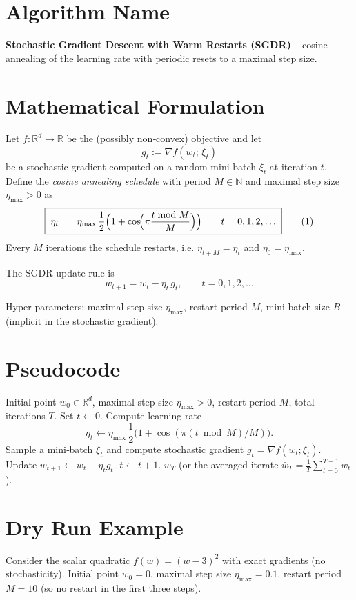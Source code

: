 \documentclass{article}
\newcommand{\R}{\mathbb{R}}
\begin{document}
\section*{Algorithm Name}
\textbf{Stochastic Gradient Descent with Warm Restarts (SGDR)} – cosine annealing of the learning rate with periodic resets to a maximal step size.

\section*{Mathematical Formulation}
Let $f:\R^{d}\to\R$ be the (possibly non‑convex) objective and let 
\[
g_t:=\nabla f(w_t;\,\xi_t)
\]
be a stochastic gradient computed on a random mini‑batch $\xi_t$ at iteration $t$.  
Define the \emph{cosine annealing schedule} with period $M\in\mathbb{N}$ and maximal step size $\eta_{\max}>0$ as
\[
\boxed{\;
\eta_t \;=\; \eta_{\max}\,\frac{1}{2}\Bigl(1+\cos\!\Bigl(\pi\frac{t\bmod M}{M}\Bigr)\Bigr)
\qquad t=0,1,2,\dots
\;}
\tag{1}
\]
Every $M$ iterations the schedule restarts, i.e. $\eta_{t+M}=\eta_t$ and $\eta_{0}=\eta_{\max}$.

The SGDR update rule is
\[
\boxed{\;
w_{t+1}=w_t-\eta_t\,g_t,\qquad t=0,1,2,\dots
\;}
\tag{2}
\]

Hyper‑parameters: maximal step size $\eta_{\max}$, restart period $M$, mini‑batch size $B$ (implicit in the stochastic gradient).

\section*{Pseudocode}
\begin{algorithm}[H]
\caption{SGDR}
\begin{algorithmic}[1]
\Require Initial point $w_0\in\R^{d}$, maximal step size $\eta_{\max}>0$, restart period $M$, total iterations $T$.
\State Set $t\gets0$.
    \State Compute learning rate 
    \[
    \eta_t\gets \eta_{\max}\,\frac{1}{2}\bigl(1+\cos(\pi (t\bmod M)/M)\bigr).
    \]
    \State Sample a mini‑batch $\xi_t$ and compute stochastic gradient $g_t=\nabla f(w_t;\xi_t)$.
    \State Update $w_{t+1}\gets w_t-\eta_t g_t$.
    \State $t\gets t+1$.
\EndWhile
\State \Return $w_T$ (or the averaged iterate $\bar w_T=\frac1T\sum_{t=0}^{T-1}w_t$).
\end{algorithmic}
\end{algorithm}

\section*{Dry Run Example}
Consider the scalar quadratic $f(w)=(w-3)^2$ with exact gradients (no stochasticity).  
Initial point $w_0=0$, maximal step size $\eta_{\max}=0.1$, restart period $M=10$ (so no restart in the first three steps).  
\end{document}
